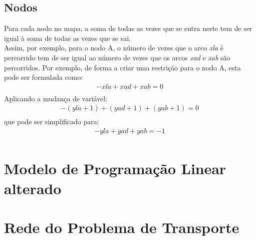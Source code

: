 \documentclass[a4paper]{report}
\begin{document}
\subsection{Nodos}
Para cada nodo no mapa, a soma de todas as vezes que se entra neste
tem de ser igual à soma de todas as vezes que se sai.\\
Assim, por exemplo, para o nodo A, o número de vezes que o arco \textit{xla} é
percorrido tem de ser igual ao número de vezes que os arcos \textit{xad} e
\textit{xab} são percorridos.
Por exemplo, de forma a criar uma restrição para o nodo A, esta pode ser
formulada como:\\
\begin{multline}
- xla + xad + xab = 0 \\
\end{multline}
Aplicando a mudança de variável:
\begin{multline}
- (yla + 1) + (yad +1) + (yab +1) = 0 \\
\end{multline}
que pode ser simplificado para:
\begin{multline}
- yla + yad + yab = -1\\
\end{multline}

\pagebreak
\section{Modelo de Programação Linear alterado}


\pagebreak
\section{Rede do Problema de Transporte}
\begin{figure}[H]
\centering
{}
\end{figure}
\end{document}
